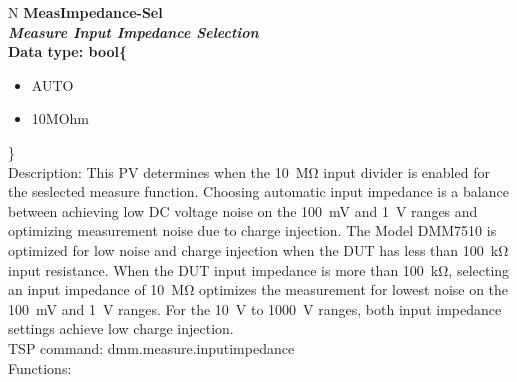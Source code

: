 \documentclass[openany]{article}
\begin{document}
		\begin{tabular}{N}
			\hline
			\bfseries MeasImpedance-Sel\label{pv:measimpedance-sel} \\ \hline
			\emph{Measure Input Impedance Selection} \\
			Data type: bool\{\begin{itemize}[noitemsep]
				\small
				\item[] AUTO
				\item[] 10MOhm
			\end{itemize}\} \\
			Description: This PV determines when the \SI{10}{\mega\ohm} input divider is enabled for the seslected measure function. Choosing automatic input impedance is a balance between achieving low DC voltage noise on the \SI{100}{\milli\volt} and \SI{1}{\volt} ranges and optimizing measurement noise due to charge injection. The Model DMM7510 is optimized for low noise and charge injection when the DUT has less than \SI{100}{\kilo\ohm} input resistance. When the DUT input impedance is more than \SI{100}{\kilo\ohm}, selecting an input impedance of \SI{10}{\mega\ohm} optimizes the measurement for lowest noise on the \SI{100}{\milli\volt} and \SI{1}{\volt} ranges. For the \SI{10}{\volt} to \SI{1000}{\volt} ranges, both input impedance settings achieve low charge injection. \\
			TSP command: dmm.measure.inputimpedance \\
			Functions: \\
			\arrayrulecolor{\FuncTableBorderColor}

		\end{tabular}
\end{document}
